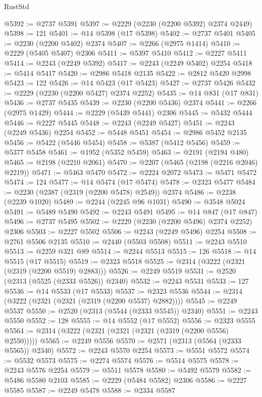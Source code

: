 \begin{lexlean}{RustStd}
\begin{coremodule}
@5392 := @2737 @5391
@5397 := @2229 (@2230 (@2200 @5392) @2374 @2449)
@5398 := 121
@5401 := @14 @5398 (@17 @5398)
@5402 := @2737 @5401
@5405 := @2230 (@2200 @5402) @2374
@5407 := @2266 (@2975 @1414)
@5410 := @2229 (@5405 @5407) @2306
@5411 := @5397 @5410
@5412 := @2227 @5411
@5414 := @2243 (@2249 @5392)
@5417 := @2243 (@2249 @5402) @2254
@5418 := @5414 @5417
@5420 := @2986 @5418 @2135
@5422 := @2812 @5420 @2998
@5423 := 122
@5426 := @14 @5423 (@17 @5423)
@5427 := @2737 @5426
@5432 := @2229 (@2230 (@2200 @5427) @2374 @2252)
@5435 := @14 @831 (@17 @831)
@5436 := @2737 @5435
@5439 := @2230 (@2200 @5436) @2374
@5441 := @2266 (@2975 @1429)
@5444 := @2229 (@5439 @5441) @2306
@5445 := @5432 @5444
@5446 := @2227 @5445
@5448 := @2243 (@2249 @5427)
@5451 := @2243 (@2249 @5436) @2254
@5452 := @5448 @5451
@5454 := @2986 @5452 @2135
@5456 := @5422 (@5446 @5454)
@5458 := @5387 (@5412 @5456)
@5459 := @5377 @5458
@5461 := @1952 (@5352 @5459)
@5463 := @2191 (@2194 @480)
@5465 := @2198 (@2210 @2061)
@5470 := @2207 (@5465 (@2198 (@2216 @2046) @2219))
@5471 := @5463 @5470
@5472 := @2224 @2072
@5473 := @5471 @5472
@5474 := 124
@5477 := @14 @5474 (@17 @5474)
@5478 := @2323 @5477
@5484 := @2230 (@2387 (@2319 (@2200 @5478) @2549)) @2374
@5486 := @2238 (@2239 @1020)
@5489 := @2244 (@2245 @96 @1031)
@5490 := @3548 @5024
@5491 := @5489 @5490
@5492 := @2243 @5491
@5495 := @14 @847 (@17 @847)
@5496 := @2737 @5495
@5502 := @2229 (@2230 (@2200 @5496) @2374 @2252) @2306
@5503 := @2227 @5502
@5506 := @2243 (@2249 @5496) @2254
@5508 := @2761 @5506 @2135
@5510 := @2440 (@5503 @5508)
@5511 := @2243 @5510
@5513 := @2259 @321 @89
@5514 := @2244 @5513
@5515 := 126
@5518 := @14 @5515 (@17 @5515)
@5519 := @2323 @5518
@5525 := @2314 (@3222 (@2321 (@2319 (@2200 @5519) @2883)))
@5526 := @2249 @5519
@5531 := @2520 (@2313 (@5525 (@2333 @5526)) @2340)
@5532 := @2243 @5531
@5533 := 127
@5536 := @14 @5533 (@17 @5533)
@5537 := @2323 @5536
@5544 := @2314 (@3222 (@2321 (@2321 (@2319 (@2200 @5537) @2882))))
@5545 := @2249 @5537
@5550 := @2520 (@2313 (@5544 (@2333 @5545)) @2340)
@5551 := @2243 @5550
@5552 := 128
@5555 := @14 @5552 (@17 @5552)
@5556 := @2323 @5555
@5564 := @2314 (@3222 (@2321 (@2321 (@2321 (@2319 (@2200 @5556) @2550)))))
@5565 := @2249 @5556
@5570 := @2571 (@2313 (@5564 (@2333 @5565)) @2340)
@5572 := @2243 @5570 @2254
@5573 := @5551 @5572
@5574 := @5532 @5573
@5575 := @2274 @5574
@5576 := @5514 @5575
@5578 := @2243 @5576 @2254
@5579 := @5511 @5578
@5580 := @5492 @5579
@5582 := @5486 @5580 @2103
@5585 := @2229 (@5484 @5582) @2306
@5586 := @2227 @5585
@5587 := @2249 @5478
@5588 := @2334 @5587

\end{coremodule}
\end{lexlean}
